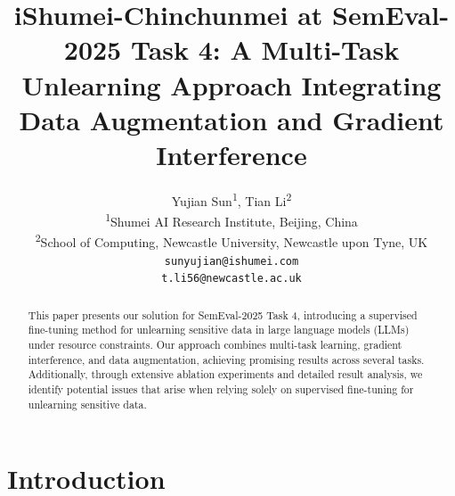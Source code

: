 \documentclass[11pt]{article}
\title{iShumei-Chinchunmei at SemEval-2025 Task 4: A Multi-Task Unlearning Approach Integrating Data Augmentation and Gradient Interference}
\author{
  Yujian Sun\textsuperscript{1},
  Tian Li\textsuperscript{2}
\\
  \textsuperscript{1}Shumei AI Research Institute, Beijing, China\\
  \textsuperscript{2}School of Computing, Newcastle University, Newcastle upon Tyne, UK
\\
  \texttt{sunyujian@ishumei.com}\\
  \texttt{t.li56@newcastle.ac.uk}
}
\begin{document}
\maketitle
\begin{abstract}


This paper presents our solution for SemEval-2025 Task 4, introducing a supervised fine-tuning method for unlearning sensitive data in large language models (LLMs) under resource constraints. Our approach combines multi-task learning, gradient interference, and data augmentation, achieving promising results across several tasks. Additionally, through extensive ablation experiments and detailed result analysis, we identify potential issues that arise when relying solely on supervised fine-tuning for unlearning sensitive data.
\end{abstract}

\section{Introduction}
\iffalse

\end{document}
